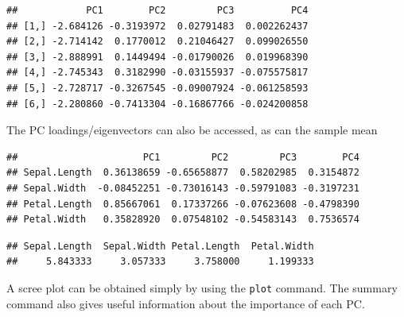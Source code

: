 \documentclass[
]{book}
\newenvironment{Shaded}{\begin{snugshade}}{\end{snugshade}}
\newcommand{\CommentTok}[1]{\textcolor[rgb]{0.56,0.35,0.01}{\textit{#1}}}
\newcommand{\FunctionTok}[1]{\textcolor[rgb]{0.13,0.29,0.53}{\textbf{#1}}}
\newcommand{\NormalTok}[1]{#1}
\newcommand{\SpecialCharTok}[1]{\textcolor[rgb]{0.81,0.36,0.00}{\textbf{#1}}}
\theoremstyle{definition}
\theoremstyle{definition}
\theoremstyle{definition}
\theoremstyle{definition}
\theoremstyle{remark}
\begin{document}
\begin{Shaded}
\end{Shaded}

\begin{verbatim}
##            PC1        PC2         PC3          PC4
## [1,] -2.684126 -0.3193972  0.02791483  0.002262437
## [2,] -2.714142  0.1770012  0.21046427  0.099026550
## [3,] -2.888991  0.1449494 -0.01790026  0.019968390
## [4,] -2.745343  0.3182990 -0.03155937 -0.075575817
## [5,] -2.728717 -0.3267545 -0.09007924 -0.061258593
## [6,] -2.280860 -0.7413304 -0.16867766 -0.024200858
\end{verbatim}

The PC loadings/eigenvectors can also be accessed, as can the sample mean

\begin{Shaded}
\end{Shaded}

\begin{verbatim}
##                      PC1         PC2         PC3        PC4
## Sepal.Length  0.36138659 -0.65658877  0.58202985  0.3154872
## Sepal.Width  -0.08452251 -0.73016143 -0.59791083 -0.3197231
## Petal.Length  0.85667061  0.17337266 -0.07623608 -0.4798390
## Petal.Width   0.35828920  0.07548102 -0.54583143  0.7536574
\end{verbatim}

\begin{Shaded}
\end{Shaded}

\begin{verbatim}
## Sepal.Length  Sepal.Width Petal.Length  Petal.Width 
##     5.843333     3.057333     3.758000     1.199333
\end{verbatim}

A scree plot can be obtained simply by using the \texttt{plot} command. The summary command also gives useful information about the importance of each PC.
\end{document}
